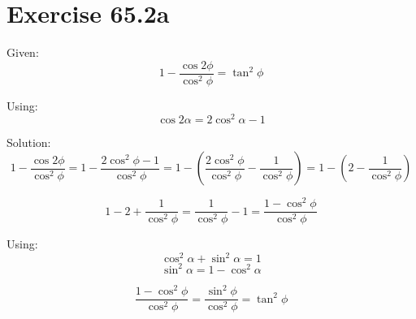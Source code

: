\documentclass[a4paper, 10pt]{scrartcl}
\begin{document}
\section{Exercise 65.2a}

Given:
\[1 - \frac{\cos{2\phi}}{\cos^{2}{\phi}} = \tan^{2}{\phi}\]

Using:
\[\cos{2\alpha} = 2\cos^{2}{\alpha} - 1\]

Solution:
\[1 - \frac{\cos{2\phi}}{\cos^{2}{\phi}} = 1 - \frac{2\cos^{2}{\phi} - 1}{\cos^{2}{\phi}} =
1 - \left(\frac{2\cos^{2}{\phi}}{\cos^{2}{\phi}} - \frac{1}{\cos^{2}{\phi}}\right) =
1 - (2 - \frac{1}{\cos^{2}{\phi}})\]

\[1 - 2 + \frac{1}{\cos^{2}{\phi}} =
\frac{1}{\cos^{2}{\phi}} - 1 =
\frac{1 - \cos^{2}{\phi}}{\cos^{2}{\phi}}\]

Using:
\[\cos^{2}{\alpha} + \sin^{2}{\alpha} = 1\]
\[\sin^{2}{\alpha} = 1 - \cos^{2}{\alpha}\]

\[\frac{1 - \cos^{2}{\phi}}{\cos^{2}{\phi}} = \frac{\sin^{2}{\phi}}{\cos^{2}{\phi}} =
\tan^{2}{\phi}\]
\end{document}
